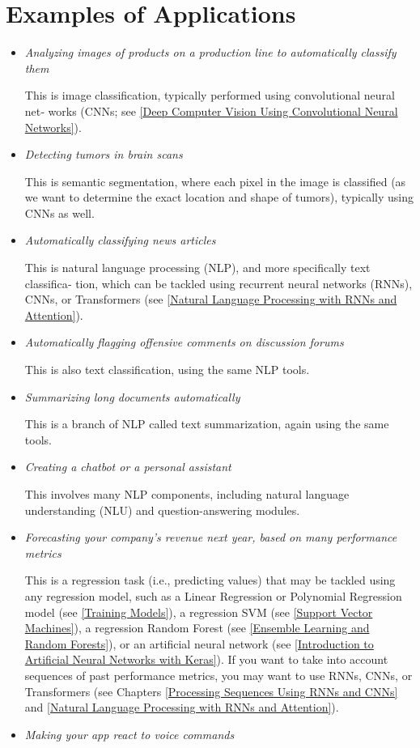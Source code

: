 \section{Examples of Applications}
\begin{itemize}
\item
\emph{Analyzing images of products on a production line to automatically classify them}

This is image classification, typically performed using convolutional neural net‐
works (CNNs; see \autoref{Deep Computer Vision Using
Convolutional Neural Networks}).
\item
\emph{Detecting tumors in brain scans}

This is semantic segmentation, where each pixel in the image is classified (as we
want to determine the exact location and shape of tumors), typically using CNNs
as well.
\item
\emph{Automatically classifying news articles}

This is natural language processing (NLP), and more specifically text classifica‐
tion, which can be tackled using recurrent neural networks (RNNs), CNNs, or
Transformers (see \autoref{Natural Language Processing with
RNNs and Attention}).
\item
\emph{Automatically flagging offensive comments on discussion forums}

This is also text classification, using the same NLP tools.
\item
\emph{Summarizing long documents automatically}

This is a branch of NLP called text summarization, again using the same tools.
\item
\emph{Creating a chatbot or a personal assistant}

This involves many NLP components, including natural language understanding
(NLU) and question-answering modules.
\item
\emph{Forecasting your company’s revenue next year, based on many performance metrics}

This is a regression task (i.e., predicting values) that may be tackled using any
regression model, such as a Linear Regression or Polynomial Regression model
(see \autoref{Training Models}), a regression SVM (see \autoref{Support Vector Machines}), a regression Random Forest
(see \autoref{Ensemble Learning and Random Forests}), or an artificial neural network (see \autoref{Introduction to Artificial Neural Networks
with Keras}). If you want to
take into account sequences of past performance metrics, you may want to use RNNs, CNNs, or Transformers (see Chapters \ref{Processing Sequences Using RNNs and CNNs} and \ref{Natural Language Processing with
RNNs and Attention}).
\item
\emph{Making your app react to voice commands}


\end{itemize}
